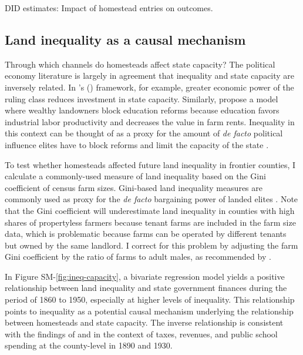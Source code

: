 \documentclass[hidelinks,12pt]{article}
\newcommand{\possessivecite}[1]{\citeauthor{#1}'s (\citeyear{#1})}
\begin{document}
\begin{table}[htbp]
	\begin{center}
		\caption{DID estimates: Impact of homestead entries on outcomes. \label{dd-estimates}}
		\resizebox{.9\width}{!}{}
	\end{center}
\end{table}

\subsection{Land inequality as a causal mechanism}  \label{mechanisms}

Through which channels do homesteads affect state capacity? The political economy literature is largely in agreement that inequality and state capacity are inversely related. In \possessivecite{besley2009origins} framework, for example, greater economic power of the ruling class reduces investment in state capacity. Similarly, \citet{galor2009inequality} propose a model where wealthy landowners block education reforms because education favors industrial labor productivity and decreases the value in farm rents. Inequality in this context can be thought of as a proxy for the amount of \emph{de facto} political influence elites have to block reforms and limit the capacity of the state \citep{acemoglu2008persistence}. 

To test whether homesteads affected future land inequality in frontier counties, I calculate a commonly-used measure of land inequality based on the Gini coefficient of census farm sizes. Gini-based land inequality measures are commonly used as proxy for the \emph{de facto} bargaining power of landed elites \citep[e.g.,][]{boix2003democracy,ziblatt2008does,ansell2015}. Note that the Gini coefficient will underestimate land inequality in counties with high shares of propertyless farmers because tenant farms are included in the farm size data, which is problematic because farms can be operated by different tenants but owned by the same landlord. I correct for this problem by adjusting the farm Gini coefficient by the ratio of farms to adult males, as recommended by \citet{vollrath2013inequality}.

In Figure SM-\ref{fig:ineq-capacity}, a bivariate regression model yields a positive relationship between land inequality and state government finances during the period of 1860 to 1950, especially at higher levels of inequality. This relationship points to inequality as a potential causal mechanism underlying the relationship between homesteads and state capacity. The inverse relationship is consistent with the findings of \citet{ramcharan2010inequality} and \citet{vollrath2013inequality} in the context of taxes, revenues, and public school spending at the county-level in 1890 and 1930.
\end{document}

